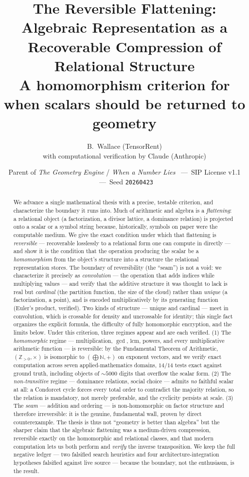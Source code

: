 \documentclass[11pt]{article}
\title{\textbf{The Reversible Flattening:\\
Algebraic Representation as a Recoverable Compression of Relational Structure}\\[4pt]
\large A homomorphism criterion for when scalars should be returned to geometry}
\author{B.\ Wallace \quad (TensorRent)\\
\small with computational verification by Claude (Anthropic)}
\date{\small Parent of \textit{The Geometry Engine} / \textit{When a Number Lies} \ ---\ SIP License v1.1 \ ---\ Seed \texttt{20260423}}
\begin{document}
\maketitle

\begin{abstract}
We advance a single mathematical thesis with a precise, testable criterion, and characterize the boundary it
runs into. Much of arithmetic and algebra is a \emph{flattening}: a relational object (a factorization, a
divisor lattice, a dominance relation) is projected onto a scalar or a symbol string because, historically,
symbols on paper were the computable medium. We give the exact condition under which that flattening is
\emph{reversible} --- recoverable losslessly to a relational form one can compute in directly --- and show it
is the condition that the operation producing the scalar be a \emph{homomorphism} from the object's structure
into a structure the relational representation stores. The boundary of reversibility (the ``seam'') is not a
void: we characterize it precisely as \emph{convolution} --- the operation that adds indices while
multiplying values --- and verify that the additive structure it was thought to lack is real but
\emph{cardinal} (the partition function, the size of the cloud) rather than \emph{unique} (a factorization,
a point), and is encoded multiplicatively by its generating function (Euler's product, verified). Two kinds
of structure --- unique and cardinal --- meet in convolution, which is crossable for density and uncrossable
for identity; this single fact organizes the explicit formula, the difficulty of fully homomorphic
encryption, and the limits below. Under this criterion, three regimes appear and are each verified. (1) The
\emph{homomorphic} regime --- multiplication, $\gcd$, $\mathrm{lcm}$, powers, and every multiplicative
arithmetic function --- is reversible: by the Fundamental Theorem of Arithmetic, $(\mathbb{Z}_{>0},\times)$
is isomorphic to $(\bigoplus \mathbb{N},+)$ on exponent vectors, and we verify exact computation across seven
applied-mathematics domains, $14/14$ tests exact against ground truth, including objects of $\sim\!5000$
digits that overflow the scalar form. (2) The \emph{non-transitive} regime --- dominance relations, social
choice --- admits \emph{no} faithful scalar at all: a Condorcet cycle forces every total order to contradict
the majority relation, so the relation is mandatory, not merely preferable, and the cyclicity persists at
scale. (3) The \emph{seam} --- addition and ordering --- is non-homomorphic on factor structure and therefore
irreversible: it is the genuine, fundamental wall, proven by direct counterexample. The thesis is thus not
``geometry is better than algebra'' but the sharper claim that the algebraic flattening was a medium-driven
compression, reversible exactly on the homomorphic and relational classes, and that modern computation lets
us both perform and \emph{verify} the inverse transposition. We keep the full negative ledger --- two
falsified search heuristics and four architecture-integration hypotheses falsified against live source ---
because the boundary, not the enthusiasm, is the result.
\end{abstract}
\end{document}
